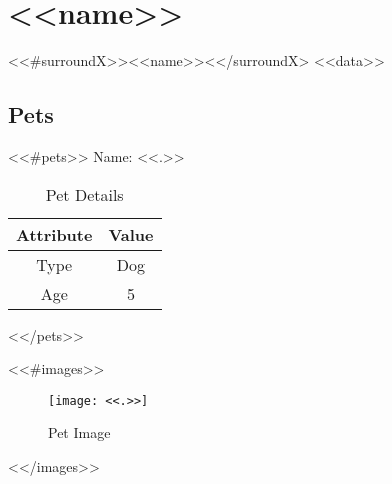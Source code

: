 \section{ <<name>> }
<<#surroundX>><<name>><</surroundX>
<<data>>

\subsection{Pets}
<<#pets>>
Name: <<.>>
\begin{table}[h!]
\centering
\begin{tabular}{|c|c|}
Attribute & Value \\ \hline
Type      & Dog   \\ 
Age       & 5     \\
\end{tabular}
\caption{Pet Details}
\end{table}
<</pets>>

<<#images>>
\begin{figure}[h!]
\centering
\texttt{[image: <<.>>]}
\caption{Pet Image}
\end{figure}
<</images>>
